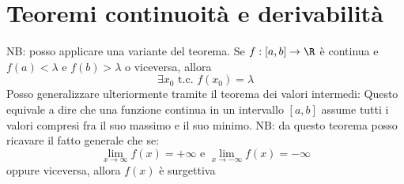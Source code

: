 \section{Teoremi continuoità e derivabilità}
NB: posso applicare una variante del teorema. Se $ f : \left[ a,b \right] \to \R $ è continua e $ f\left( a \right) < \lambda  $ e $ f\left( b \right) > \lambda  $ o viceversa, allora
\[
\exists x_0  \text{ t.c. } f\left( x_0 \right) = \lambda 
\] 
Posso generalizzare ulteriormente tramite il teorema dei valori intermedi:
Questo equivale a dire che una funzione continua in un intervallo $ \left[ a,b \right]  $ assume tutti i valori compresi fra il suo massimo e il suo minimo. NB: da questo teorema posso ricavare il fatto generale che se:
\[
\lim_{x \to \infty} f(x) = + \infty \text{ e } \lim_{x \to -\infty} f(x) = -\infty
\] 
oppure viceversa, allora $ f\left( x \right)  $ è surgettiva
